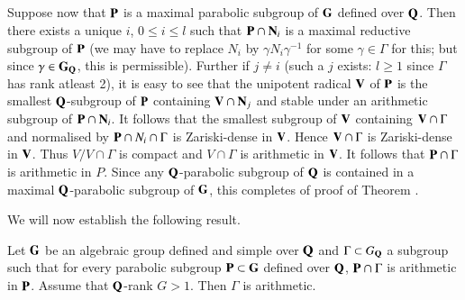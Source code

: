 \subsection{}\label{art9-subsec4.42}
Suppose now that $\mathbf{P}$ is a maximal parabolic subgroup of $\mathbf{G}$ defined over $\mathbf{Q}$. Then there exists a unique $i$, $0 \leqslant i \leqslant l$ such that $\mathbf{P} \cap \mathbf{N}_i$ is a maximal reductive subgroup of $\mathbf{P}$ (we may have to replace $N_i$ by $\gamma N_i \gamma^{-1}$ for some $\gamma \in \Gamma$ for this; but since $\gamma \in \mathbf{G}_{\mathbf{Q}}$, this is permissible). Further if $j \neq i$ (such a $j$ exists: $l \geqslant 1$ since $\Gamma$ has rank atleast 2), it is easy to see that the unipotent radical $\mathbf{V}$ of $\mathbf{P}$ is the smallest $\mathbf{Q}$-subgroup of $\mathbf{P}$ containing $\mathbf{V} \cap \mathbf{N}_j$ and stable under an arithmetic subgroup of $\mathbf{P} \cap \mathbf{N}_i$. It follows that the  smallest subgroup of $\mathbf{V}$ containing $\mathbf{V} \cap \Gamma$ and normalised by $\mathbf{P} \cap N_i \cap \Gamma$ is Zariski-dense in $\mathbf{V}$. Hence $\mathbf{V} \cap \Gamma$ is Zariski-dense in $\mathbf{V}$. Thus $V/V \cap \Gamma$ is compact and $V \cap \Gamma$ is arithmetic in $\mathbf{V}$. It follows that $\mathbf{P} \cap \Gamma$ is arithmetic in $P$. Since any $\mathbf{Q}$-parabolic subgroup of $\mathbf{Q}$ is contained in a maximal $\mathbf{Q}$-parabolic subgroup of $\mathbf{G}$, this completes of proof of Theorem \label{art9-thm4.4}.

We will now establish the following result.

\begin{theorem}\label{art9-thm4.43}
Let $\mathbf{G}$ be an algebraic group defined and simple over $\mathbf{Q}$ and $\Gamma \subset G_{\mathbf{Q}}$ a subgroup such that for every parabolic subgroup $\mathbf{P} \subset \mathbf{G}$ defined over $\mathbf{Q}$, $\mathbf{P} \cap \Gamma$ is arithmetic in $\mathbf{P}$. Assume that $\mathbf{Q}$-rank $G > 1$. Then $\Gamma$ is arithmetic.
\end{theorem}

